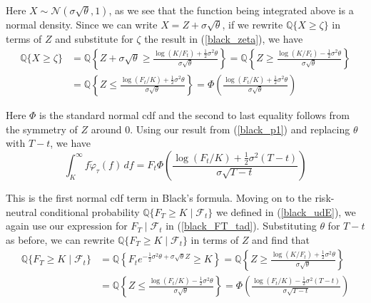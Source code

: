 \documentclass{article}
\numberwithin{equation}{section}
\begin{document}
Here $ X \sim \mathcal{N}(\sigma\sqrt{\theta}, 1) $, as we see that the function
being integrated above is a normal density. Since we can write
$ X = Z + \sigma\sqrt{\theta} $, if we rewrite $ \mathbb{Q}\{X \ge \zeta\} $
in terms of $ Z $ and substitute for $ \zeta $ the result in (\ref{black_zeta}),
we have
\begin{equation} \label{black_p1}
    \begin{split}
        \mathbb{Q}\{X \ge \zeta\} & =
        \mathbb{Q}\left\{Z + \sigma\sqrt{\theta} \ge \frac{\log(K / F_t) +
        \frac{1}{2}\sigma^2\theta}{\sigma\sqrt{\theta}}\right\} =
        \mathbb{Q}\left\{Z \ge \frac{
            \log(K / F_t) - \frac{1}{2}\sigma^2\theta
        }{\sigma\sqrt{\theta}}\right\} \\ & =
        \mathbb{Q}\left\{Z \le \frac{
            \log(F_t / K) + \frac{1}{2}\sigma^2\theta
        }{\sigma\sqrt{\theta}}\right\} =
        \Phi\left(\frac{
            \log(F_t / K) + \frac{1}{2}\sigma^2\theta
        }{\sigma\sqrt{\theta}}\right)
    \end{split}
\end{equation}

Here $ \Phi $ is the standard normal cdf and the second to last equality follows
from the symmetry of $ Z $ around $ 0 $. Using our result from (\ref{black_p1})
and replacing $ \theta $ with $ T - t $, we have
\begin{equation} \label{black_partial_E}
    \int_K^\infty f\widetilde{\varphi}_\tau(f)\,df =
    F_t\Phi\left(\frac{
        \log(F_t / K) + \frac{1}{2}\sigma^2(T - t)
    }{\sigma\sqrt{T - t}}\right)
\end{equation}

This is the first normal cdf term in Black's formula. Moving on to the
risk-neutral conditional probability
$ \mathbb{Q}\{F_T \ge K \mid \mathcal{F}_t\} $ we defined in (\ref{black_udE}),
we again use our expression for $ F_T \mid \mathcal{F}_t $ in
(\ref{black_FT_tad}). Substituting $ \theta $ for $ T - t $ as before, we can
rewrite $ \mathbb{Q}\{F_T \ge K \mid \mathcal{F}_t\} $ in terms of $ Z $ and
find that
\begin{equation} \label{black_p2}
    \begin{split}
        \mathbb{Q}\{F_T \ge K \mid \mathcal{F}_t\} & =
        \mathbb{Q}\left\{F_te^{
            -\frac{1}{2}\sigma^2\theta + \sigma\sqrt{\theta}Z
        } \ge K\right\} =
        \mathbb{Q}\left\{Z \ge \frac{
            \log(K / F_t) + \frac{1}{2}\sigma^2\theta
        }{\sigma\sqrt{\theta}}\right\} \\ & =
        \mathbb{Q}\left\{Z \le \frac{
            \log(F_t / K) - \frac{1}{2}\sigma^2\theta
        }{\sigma\sqrt{\theta}}\right\} =
        \Phi\left(\frac{
            \log(F_t / K) - \frac{1}{2}\sigma^2(T - t)
        }{\sigma\sqrt{T - t}}\right)
    \end{split}
\end{equation}
\end{document}
